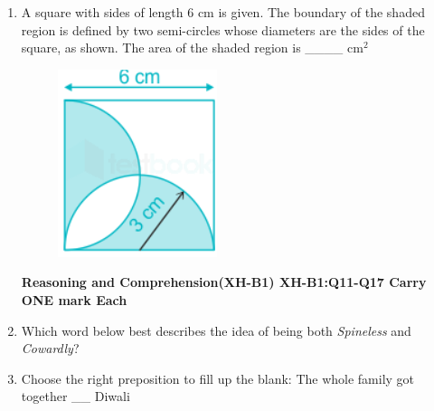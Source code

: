 \documentclass[12pt]{article}
\theoremstyle{remark}
\begin{document}
\begin{enumerate}
\item A square with sides of length 6 cm is given. The boundary of the shaded region is defined by two semi-circles whose diameters are the sides of the square, as shown. The area of the shaded region is \_\_\_\_ cm$^2$
\begin{figure}[H]
\centering
\includegraphics{Figs/Q10.png}
\caption{}
\label{Fig:1.3}
\end{figure} 
\begin{enumerate}  \end{enumerate}
\hfill{}
\newpage
\textbf{Reasoning and Comprehension(XH-B1)\newline 
XH-B1:Q11-Q17 Carry ONE mark Each}
\item  Which word below best describes the idea of being both \textit{Spineless} and \textit{Cowardly}? 
\begin{enumerate}  \end{enumerate}
\hfill{}
\item   Choose the right preposition to fill up the blank: \newline
 The whole family got together \_\_ Diwali  
 \begin{enumerate} 
\end{enumerate}
\end{enumerate}
\end{document}
